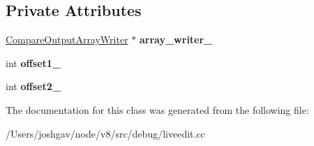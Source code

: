 \subsection*{Private Attributes}
\begin{DoxyCompactItemize}
\item 
\hyperlink{classv8_1_1internal_1_1_compare_output_array_writer}{Compare\+Output\+Array\+Writer} $\ast$ {\bfseries array\+\_\+writer\+\_\+}\hypertarget{classv8_1_1internal_1_1_tokens_compare_output_af3ea9d4518da22b080d098bc27c372fb}{}\label{classv8_1_1internal_1_1_tokens_compare_output_af3ea9d4518da22b080d098bc27c372fb}

\item 
int {\bfseries offset1\+\_\+}\hypertarget{classv8_1_1internal_1_1_tokens_compare_output_ad0f234fd6f11b1594b57d406f1cd0967}{}\label{classv8_1_1internal_1_1_tokens_compare_output_ad0f234fd6f11b1594b57d406f1cd0967}

\item 
int {\bfseries offset2\+\_\+}\hypertarget{classv8_1_1internal_1_1_tokens_compare_output_abd53a89ea54e3c67a637a2748d400703}{}\label{classv8_1_1internal_1_1_tokens_compare_output_abd53a89ea54e3c67a637a2748d400703}

\end{DoxyCompactItemize}


The documentation for this class was generated from the following file\+:\begin{DoxyCompactItemize}
\item 
/\+Users/joshgav/node/v8/src/debug/liveedit.\+cc\end{DoxyCompactItemize}
